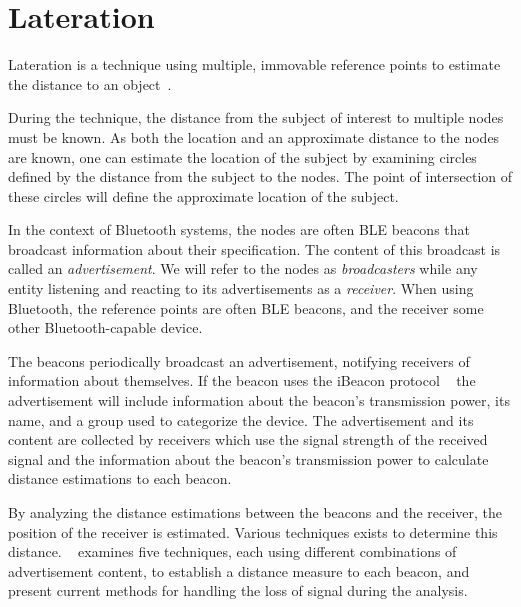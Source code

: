 \section{Lateration}
Lateration is a technique using multiple, immovable reference points to estimate the distance to an object~\cite{presence_ble_review}.

During the technique, the distance from the subject of interest to multiple nodes must be known. 
As both the location and an approximate distance to the nodes are known, one can estimate the location of the subject by examining circles defined by the distance from the subject to the nodes.
The point of intersection of these circles will define the approximate location of the subject.\cite{laterationExplanation}  

In the context of Bluetooth systems, the nodes are often BLE beacons that broadcast information about their specification. 
The content of this broadcast is called an \textit{advertisement}. 
We will refer to the nodes as \textit{broadcasters} while any entity listening and reacting to its advertisements as a \textit{receiver}.
When using Bluetooth, the reference points are often BLE beacons, and the receiver some other Bluetooth-capable device.~\cite{apple2023ibeacon} 

The beacons periodically broadcast an advertisement, notifying receivers of information about themselves. 
If the beacon uses the iBeacon protocol ~\cite{apple2023ibeacon} the advertisement will include information about the beacon's transmission power, its name, and a group used to categorize the device.
The advertisement and its content are collected by receivers which use the signal strength of the received signal and the information about the beacon's transmission power to calculate distance estimations to each beacon. 

By analyzing the distance estimations between the beacons and the receiver, the position of the receiver is estimated.
Various techniques exists to determine this distance.
\citeauthor{presence_ble_review}~\cite{presence_ble_review} examines five techniques, each using different combinations of advertisement content, to establish a distance measure to each beacon, and present current methods for handling the loss of signal during the analysis.

